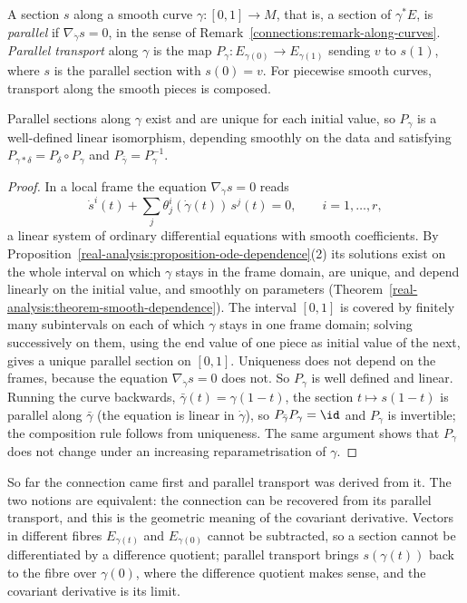 \begin{definition}\label{connections:definition-parallel}
A section $s$ along a smooth curve $\gamma \colon [0, 1] \to M$, that is, a section of $\gamma^*E$, is \emph{parallel} if $\nabla_{\dot\gamma}s = 0$, in the sense of
Remark~\ref{connections:remark-along-curves}. \emph{Parallel transport} along $\gamma$ is the map $P_\gamma \colon E_{\gamma(0)} \to E_{\gamma(1)}$
sending $v$ to $s(1)$, where $s$ is the parallel section with $s(0) = v$. For piecewise smooth curves, transport along the smooth pieces is composed.
\end{definition}

\begin{proposition}\label{connections:proposition-parallel-transport}
Parallel sections along $\gamma$ exist and are unique for each initial value, so $P_\gamma$ is a well-defined linear isomorphism, depending smoothly on the data and satisfying
$P_{\gamma \ast \delta} = P_\delta \circ P_\gamma$ and $P_{\bar\gamma} = P_\gamma^{-1}$.
\end{proposition}

\begin{proof}
In a local frame the equation $\nabla_{\dot\gamma}s = 0$ reads
\[
\dot s^i(t) + \sum_j\theta^i_j(\dot\gamma(t))\,s^j(t) = 0, \qquad i = 1, \ldots, r,
\]
a linear system of ordinary differential equations with smooth coefficients. By Proposition~\ref{real-analysis:proposition-ode-dependence}(2) its solutions exist on the whole
interval on which $\gamma$ stays in the frame domain, are unique, and depend linearly on the initial value, and smoothly on parameters
(Theorem~\ref{real-analysis:theorem-smooth-dependence}). The interval $[0, 1]$ is covered by finitely many subintervals on each of which $\gamma$ stays in one frame domain; solving
successively on them, using the end value of one piece as initial value of the next, gives a unique parallel section on $[0, 1]$. Uniqueness does not depend on the frames,
because the equation $\nabla_{\dot\gamma}s = 0$ does not. So $P_\gamma$ is well defined and linear. Running the curve backwards, $\bar\gamma(t) = \gamma(1 - t)$, the section
$t \mapsto s(1 - t)$ is parallel along $\bar\gamma$ (the equation is linear in $\dot\gamma$), so $P_{\bar\gamma}P_\gamma = \id$ and $P_\gamma$ is invertible; the composition rule follows
from uniqueness. The same argument shows that $P_\gamma$ does not change under an increasing reparametrisation of $\gamma$.
\end{proof}

So far the connection came first and parallel transport was derived from it. The two notions are equivalent: the connection can be recovered from its parallel transport, and this is the
geometric meaning of the covariant derivative. Vectors in different fibres $E_{\gamma(t)}$ and $E_{\gamma(0)}$ cannot be subtracted, so a section cannot be differentiated by a difference quotient; parallel
transport brings $s(\gamma(t))$ back to the fibre over $\gamma(0)$, where the difference quotient makes sense, and the covariant derivative is its limit.

